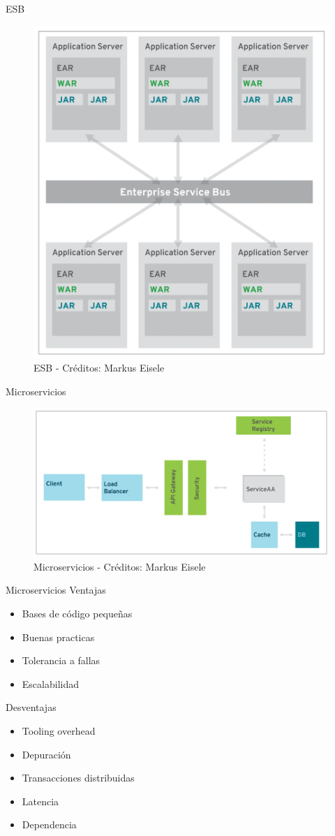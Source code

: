 \documentclass{beamer}
\begin{document}
\begin{frame}{ESB}
\begin{figure}
\centering
\includegraphics[width=0.5\linewidth]{Images/esb}
\caption{ESB - Créditos: Markus Eisele}
\end{figure}
\end{frame}

\begin{frame}{Microservicios}
\begin{figure}
\centering
\includegraphics[width=\linewidth]{Images/microservicios}
\caption{Microservicios - Créditos: Markus Eisele}
\end{figure}
\end{frame}

\begin{frame}{Microservicios}
Ventajas
\begin{itemize}
	\item Bases de código pequeñas
	\item Buenas practicas
	\item Tolerancia a fallas
	\item Escalabilidad
\end{itemize}
Desventajas
\begin{itemize}
	\item Tooling overhead
	\item Depuración
	\item Transacciones distribuidas
	\item Latencia
	\item Dependencia
\end{itemize}
\end{frame}
\end{document}
